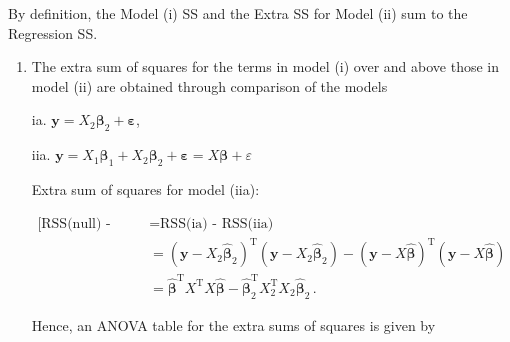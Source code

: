 \documentclass[
]{book}
\theoremstyle{definition}
\theoremstyle{definition}
\theoremstyle{definition}
\theoremstyle{definition}
\theoremstyle{remark}
\begin{document}
By definition, the Model (i) SS and the Extra SS for Model (ii) sum to the Regression SS.

\begin{enumerate}
\def\labelenumi{\alph{enumi}.}
\item
  The extra sum of squares for the terms in model (i) over and above those in model (ii) are obtained through comparison of the models

  ia. \(\boldsymbol{y}= X_2\boldsymbol{\beta}_2 + \boldsymbol{\varepsilon}\),

  iia. \(\boldsymbol{y}= X_1\boldsymbol{\beta}_1 + X_2\boldsymbol{\beta}_2+ \boldsymbol{\varepsilon}= X\boldsymbol{\beta}+ \varepsilon\)

  Extra sum of squares for model (iia):

  \begin{align*}
  \mbox{[RSS(null) - RSS(iia)] - [RSS(null) - RSS(ia)]} & = \mbox{RSS(ia) - RSS(iia)}\\
  & = (\boldsymbol{y}- X_2\hat{\boldsymbol{\beta}}_2)^{\mathrm{T}}(\boldsymbol{y}- X_2\hat{\boldsymbol{\beta}}_2) - (\boldsymbol{y}- X\hat{\boldsymbol{\beta}})^{\mathrm{T}}(\boldsymbol{y}- X\hat{\boldsymbol{\beta}})\\
  & = \hat{\boldsymbol{\beta}}^{\mathrm{T}}X^{\mathrm{T}}X\hat{\boldsymbol{\beta}} - \hat{\boldsymbol{\beta}}_2^{\mathrm{T}}X_2^{\mathrm{T}}X_2\hat{\boldsymbol{\beta}}_2\,.
   \end{align*}

  Hence, an ANOVA table for the extra sums of squares is given by


\end{enumerate}
\end{document}
